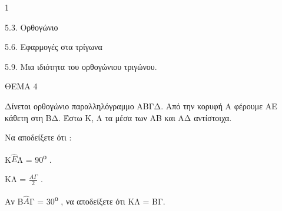 \begin{ylh}{1}
    \item 5.3. Ορθογώνιο
    \item 5.6. Εφαρμογές στα τρίγωνα
    \item 5.9. Μια ιδιότητα του ορθογώνιου τριγώνου.
\end{ylh}

ΘΕΜΑ 4

Δίνεται ορθογώνιο παραλληλόγραμμο ΑΒΓΔ. Από την κορυφή Α φέρουμε ΑΕ κάθετη στη ΒΔ. Έστω Κ, Λ τα μέσα των ΑΒ και ΑΔ αντίστοιχα.

\begin{alist}
\item Να αποδείξετε ότι :

\begin{alist}
\item
  Κ$\widehat{Ε}$Λ = 90\textsuperscript{ο} .
\item
  ΚΛ = $\frac{Α\Gamma}{2}$ .


\item Αν Β$\widehat{Α}$Γ = 30\textsuperscript{ο} , να αποδείξετε ότι ΚΛ = ΒΓ. 


\begin{center}
\end{center}
\end{alist}
\end{alist}
